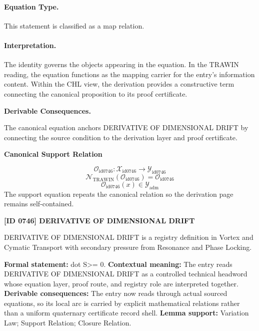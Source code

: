 \paragraph{Equation Type.}
This statement is classified as a map relation.

\paragraph{Interpretation.}
The identity governs the objects appearing in the equation. In the TRAWIN reading, the equation functions as the mapping carrier for the entry’s information content. Within the CHL view, the derivation provides a constructive term connecting the canonical proposition to its proof certificate.

\par\vspace{0.35em}
\noindent\textbf{Derivable Consequences.}\quad
\begingroup
\footnotesize
\raggedright
The canonical equation anchors DERIVATIVE OF DIMENSIONAL DRIFT by connecting the source condition to the derivation layer and proof certificate.
\par\endgroup

\noindent\textbf{Canonical Support Relation}\par
\[
\mathcal{O}_{\mathrm{id0746}}:\mathcal{X}_{\mathrm{id0746}}\longrightarrow\mathcal{Y}_{\mathrm{id0746}}
\]
\[
\mathcal{N}_{\mathrm{TRAWIN}}(\mathcal{O}_{\mathrm{id0746}})=\mathcal{O}_{\mathrm{id0746}}
\]
\[
\mathcal{O}_{\mathrm{id0746}}(x)\in\mathcal{Y}_{\mathrm{adm}}
\]
\noindent The support equation repeats the canonical relation so the derivation page remains self-contained.\par

\clearpage
\noindent\textbf{[ID 0746] DERIVATIVE OF DIMENSIONAL DRIFT}\par
\vspace{0.35em}
\begingroup\small
{}
DERIVATIVE OF DIMENSIONAL DRIFT is a registry definition in Vortex and Cymatic Transport with secondary pressure from Resonance and Phase Locking.

\begingroup\footnotesize\setlength{\emergencystretch}{3em}\sloppy
\textbf{Formal statement:} dot S>= 0. \textbf{Contextual meaning:} The entry reads DERIVATIVE OF DIMENSIONAL DRIFT as a controlled technical headword whose equation layer, proof route, and registry role are interpreted together. \textbf{Derivable consequences:} The entry now reads through actual sourced equations, so its local arc is carried by explicit mathematical relations rather than a uniform quaternary certificate record shell. \textbf{Lemma support:} Variation Law; Support Relation; Closure Relation.\par
\endgroup

